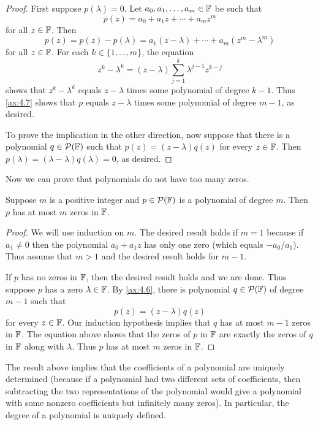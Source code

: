 \begin{proof}
First suppose $p(\lambda)=0$. Let $a_0,a_1,\dots,a_m\in\mathbb{F}$ be such that
\[ p(z) = a_0+a_1z+\cdots+a_mz^m \]
for all $z\in\mathbb{F}$. Then
\begin{equation*}
p(z) = p(z)-p(\lambda) = a_1(z-\lambda)+\cdots+a_m(z^m-\lambda^m)
\tag*{\thetheorem}\label{ax:4.7}
\end{equation*}
for all $z\in\mathbb{F}$. For each $k\in\{1,\dots,m\}$, the equation
\[ z^k-\lambda^k = (z-\lambda)\sum_{j=1}^{k}\lambda^{j-1}z^{k-j} \]
shows that $z^k-\lambda^k$ equals $z-\lambda$ times some polynomial of degree
$k-1$. Thus \ref{ax:4.7} shows that $p$ equals $z-\lambda$ times some
polynomial of degree $m-1$, as desired.

To prove the implication in the other direction, now suppose that there is a
polynomial $q\in\mathcal{P}(\mathbb{F})$ such that $p(z)=(z-\lambda)q(z)$ for every
$z\in\mathbb{F}$. Then $p(\lambda)=(\lambda-\lambda)q(\lambda)=0$, as desired.
\end{proof}

Now we can prove that polynomials do not have too many zeros.

\begin{result}\label{ax:4.8}
Suppose $m$ is a positive integer and $p\in\mathcal{P}(\mathbb{F})$ is a polynomial of degree
$m$. Then $p$ has at most $m$ zeros in $\mathbb{F}$.
\end{result}

\begin{proof}
We will use induction on $m$. The desired result holds if $m=1$ because if
$a_1\ne0$ then the polynomial $a_0+a_1z$ has only one zero (which equals
$-a_0/a_1$). Thus assume that $m>1$ and the desired result holds for $m-1$.

If $p$ has no zeros in $\mathbb{F}$, then the desired result holds and we are done.
Thus suppose $p$ has a zero $\lambda\in\mathbb{F}$. By \ref{ax:4.6}, there is
polynomial $q\in\mathcal{P}(\mathbb{F})$ of degree $m-1$ such that
\[ p(z) = (z-\lambda)q(z) \]
for every $z\in\mathbb{F}$. Our induction hypothesis implies that $q$ has at most $m-1$
zeros in $\mathbb{F}$. The equation above shows that the zeros of $p$ in $\mathbb{F}$ are
exactly the zeros of $q$ in $\mathbb{F}$ along with $\lambda$. Thus $p$ has at most $m$
zeros in $\mathbb{F}$.
\end{proof}

The result above implies that the coefficients of a polynomial are uniquely
determined (because if a polynomial had two different sets of coefficients,
then subtracting the two representations of the polynomial would give a
polynomial with some nonzero coefficients but infinitely many zeros). In
particular, the degree of a polynomial is uniquely defined.

